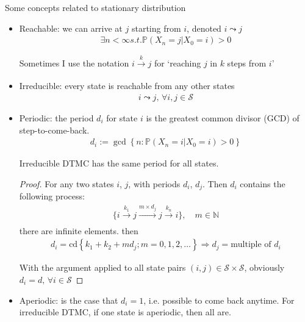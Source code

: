         Some concepts related to stationary distribution
    \begin{itemize}[topsep=2pt,itemsep=0pt]
        \item Reachable: we can arrive at $ j $ starting from $ i $, denoted $ i\leadsto j $
        \begin{align*}
            \exists n<\infty s.t. \mathbb{P}\left( X_n=j|X_0=i \right) > 0 
        \end{align*}

        Sometimes I use the notation $ i\xrightarrow[]{k}j  $ for `reaching $ j $ in $ k $ steps from $ i $'
        \item Irreducible: every state is reachable from any other states
        \begin{align*}
            i\leadsto j,\,\forall i,j\in\mathcal{S} 
        \end{align*}
        
        \item Periodic: the period $ d_i $ for state $ i $ is the greatest common divisor (GCD) of step-to-come-back.
        \begin{align*}
            d_i:=\gcd\left\{ n:\mathbb{P}\left( X_n=i|X_0=i \right)>0  \right\} 
        \end{align*}

        Irreducible DTMC has the same period for all states.

        \begin{proof}
            For any two states $ i $, $ j $, with periods $ d_i $, $ d_j $. Then $ d_i $ contains the following process:
            \begin{align*}
                \{i\xrightarrow[]{k_1}j\xrightarrow[]{m\times d_j}j\xrightarrow[]{k_n}i \} ,\quad m\in\mathbb{N}
            \end{align*}
            there are infinite elements. then
            \begin{align*}
                d_i=\mathrm{cd} \left\{ k_1+k_2+md_j;m=0,1,2,\ldots \right\} \Rightarrow d_j=\text{multiple of }d_i
            \end{align*}
         
            With the argument applied to all state pairs $ (i,j)\in\mathcal{S}\times \mathcal{S} $, obviously $ d_i=d,\,\forall i\in\mathcal{S} $
        \end{proof}
        \item Aperiodic: is the case that $ d_i=1 $, i.e. possible to come back anytime. For irreducible DTMC, if one state is aperiodic, then all are.        
        

\end{itemize}
